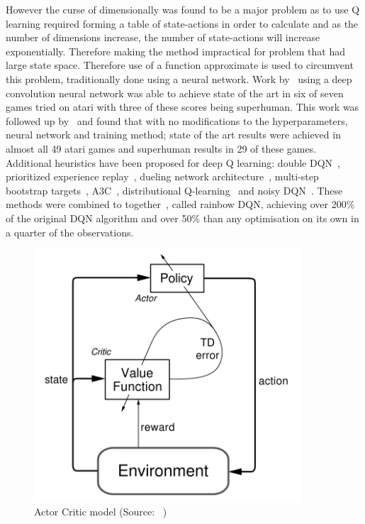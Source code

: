 However the curse of dimensionally was found to be a major problem as to use Q learning required
forming a table of state-actions in order to calculate and as the number of dimensions increase, the number of
state-actions will increase exponentially. Therefore making the method impractical for problem that had large state
space. Therefore use of a function approximate is used to circumvent this problem, traditionally done using a neural
network. Work by~\cite{atari} using a deep convolution neural network was able to achieve state of the art in six of seven
games tried on atari with three of these scores being superhuman. This work was followed up by~\cite{mnih2015humanlevel}
and found that with no modifications to the hyperparameters, neural network and training method; state of the art results were
achieved in almost all 49 atari games and superhuman results in 29 of these games. Additional heuristics have been
proposed for deep Q learning: double DQN~\citep{doubledqn}, prioritized experience replay~\citep{prioritizedexperiencereplay},
dueling network architecture~\citep{duelingdqn}, multi-step bootstrap targets~\citep{multi-step-dqn, Sutton1998},
A3C~\cite{A3C}, distributional Q-learning~\citep{distributional_dqn} and noisy DQN~\citep{noisy_dqn}. These methods were
combined to together~\cite{rainbow}, called rainbow DQN, achieving over 200\% of the original DQN algorithm and over
50\% than any optimisation on its own in a quarter of the observations.

\begin{figure}[h]
    \includegraphics[width=10cm]{figures/actor-critic.png}
    \caption{Actor Critic model (Source: ~\cite{Sutton1998})}
    \label{fig:actor-critic-model}
\end{figure}

